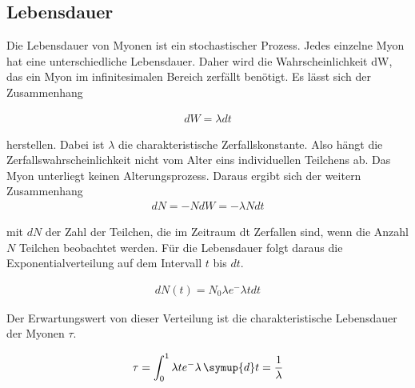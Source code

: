 \subsection{Lebensdauer}
Die Lebensdauer von Myonen ist ein stochastischer Prozess. 
Jedes einzelne Myon hat eine unterschiedliche Lebensdauer. Daher wird die Wahrscheinlichkeit dW, das ein Myon im infinitesimalen Bereich zerfällt benötigt. 
Es lässt sich der Zusammenhang

\begin{align*}
dW = \lambda dt
\end{align*}

\noindent herstellen. Dabei ist $\lambda$ die charakteristische Zerfallskonstante. 
Also hängt die Zerfallswahrscheinlichkeit nicht vom Alter eins individuellen Teilchens ab. 
Das Myon unterliegt keinen Alterungsprozess. Daraus ergibt sich der weitern Zusammenhang
\begin{align*}
dN = -N dW =-\lambda N dt
\end{align*}

\noindent mit $dN$ der Zahl der Teilchen, die im Zeitraum dt Zerfallen sind, wenn die Anzahl $N$ Teilchen beobachtet werden.  
Für die Lebensdauer folgt daraus die Exponentialverteilung auf dem Intervall $t$ bis $dt$.

\begin{align*}
dN(t) = N_0 \lambda e^- \lambda t dt
\end{align*}

\noindent Der Erwartungswert von dieser Verteilung ist die charakteristische Lebensdauer der Myonen $\tau$.

\begin{align*}
\tau = \int_{0}^{1} \lambda t e^-\lambda \, \symup{d}t = \frac{1}{\lambda}
\end{align*}
